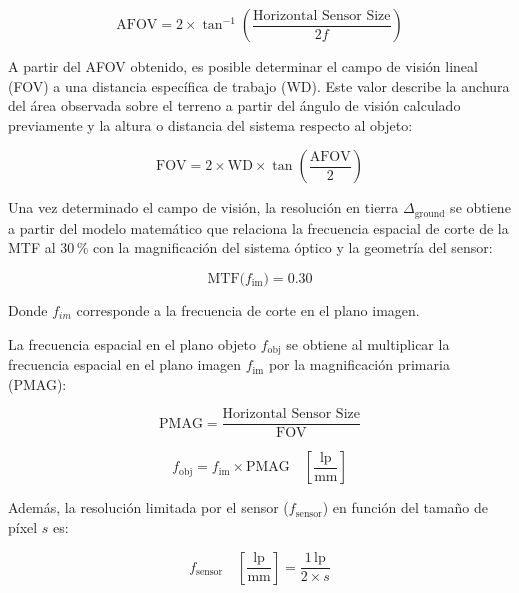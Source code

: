 \begin{equation}
    \label{eq:afov}
    \mathrm{AFOV}=2 \times \tan ^{-1}\left(\frac{\text{Horizontal Sensor Size}}{2 f}\right)
\end{equation}

\noindent A partir del AFOV obtenido, es posible determinar el campo de visión lineal (FOV) a una distancia específica de trabajo (WD). Este valor describe la anchura del área observada sobre el terreno a partir del ángulo de visión calculado previamente y la altura o distancia del sistema respecto al objeto:

\begin{equation}
    \mathrm{FOV}=2 \times \mathrm{WD} \times \tan \left(\frac{\mathrm{AFOV}}{2}\right)
\end{equation}

\noindent Una vez determinado el campo de visión, la resolución en tierra \(\Delta_{\text{ground}}\) se obtiene a partir del modelo matemático que relaciona la frecuencia espacial de corte de la MTF al 30\,\% con la magnificación del sistema óptico y la geometría del sensor:

\begin{equation}
    \text{MTF}\bigl(f_{\text{im}}\bigr)=0.30
    \label{eq:mtf_cutoff}
\end{equation}

\noindent Donde $f_{im}$ corresponde a la frecuencia de corte en el plano imagen.

\noindent La frecuencia espacial en el plano objeto \(f_{\text{obj}}\) se obtiene al multiplicar la frecuencia espacial en el plano imagen \(f_{\text{im}}\) por la magnificación primaria (PMAG):

\begin{equation}
    \text{PMAG}= \frac{\text{Horizontal Sensor Size}}{\text{FOV}}
    \label{eq:pmag}
\end{equation}

\begin{equation}
    f_{\text{obj}} = f_{\text{im}} \times \text{PMAG}
    \quad\left[\frac{\text{lp}}{\text{mm}}\right]
    \label{eq:f_obj}
\end{equation}

\noindent Además, la resolución limitada por el sensor ($f_{\text{sensor}}$) en función del tamaño de píxel \(s\) es:

\begin{equation}
    f_{\text{sensor}}\quad\left[\frac{\text{lp}}{\text{mm}}\right] = \frac{1\,\text{lp}}{2 \times s}
    \label{eq:sensor_res}
\end{equation}

